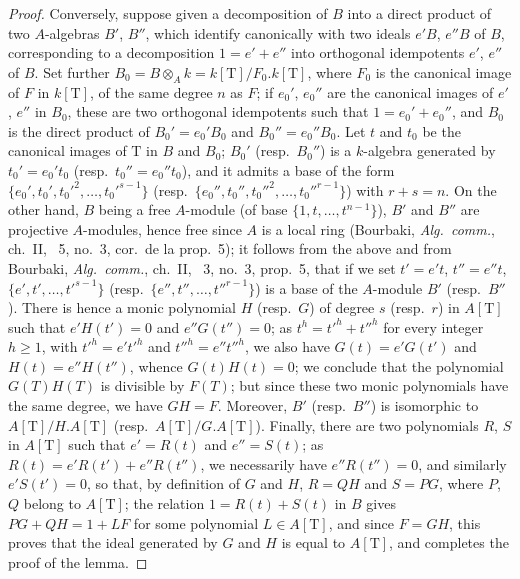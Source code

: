 \begin{proof}
Conversely, suppose given a decomposition of $B$ into a direct product of two $A$-algebras $B'$, $B''$, which identify canonically with two ideals $e'B$, $e''B$ of $B$, corresponding to a decomposition $1=e'+e''$ into orthogonal idempotents $e'$, $e''$ of $B$.
Set further $B_0=B\otimes_A k=k[\mathrm{T}]/F_0.k[\mathrm{T}]$, where $F_0$ is the canonical image of $F$ in $k[\mathrm{T}]$, of the same degree $n$ as $F$;
if $e_0'$, $e_0''$ are the canonical images of $e'$, $e''$ in $B_0$, these are two orthogonal idempotents such that $1=e_0'+e_0''$, and $B_0$ is the direct product of $B_0'=e_0'B_0$ and $B_0''=e_0''B_0$.
Let $t$ and $t_0$ be the canonical images of $\mathrm{T}$ in $B$ and $B_0$;
$B_0'$ (resp.\ $B_0''$) is a $k$-algebra generated by $t_0'=e_0't_0$ (resp.\ $t_0''=e_0''t_0$), and it admits a base of the form $\{e_0',t_0',t_0'^2,\ldots,t_0'^{s-1}\}$ (resp.\ $\{e_0'',t_0'',t_0''^2,\ldots,t_0''^{r-1}\}$) with $r+s=n$.
On the other hand, $B$ being a free $A$-module (of base $\{1,t,\ldots,t^{n-1}\}$), $B'$ and $B''$ are projective $A$-modules, hence free since $A$ is a local ring (Bourbaki, \emph{Alg.\ comm.}, ch.~II, \textsection~5, no.~3, cor.\ de la prop.~5);
it follows from the above and from Bourbaki, \emph{Alg.\ comm.}, ch.~II, \textsection~3, no.~3, prop.~5, that if we set $t'=e't$, $t''=e''t$, $\{e',t',\ldots,t'^{s-1}\}$ (resp.\ $\{e'',t'',\ldots,t''^{r-1}\}$) is a base of the $A$-module $B'$ (resp.\ $B''$).
There is hence a monic polynomial $H$ (resp.\ $G$) of degree $s$ (resp.\ $r$) in $A[\mathrm{T}]$ such that $e'H(t')=0$ and $e''G(t'')=0$;
as $t^h=t'^h+t''^h$ for every integer $h\geq 1$, with $t'^h=e't'^h$ and $t''^h=e''t''^h$, we also have $G(t)=e'G(t')$ and $H(t)=e''H(t'')$, whence $G(t)H(t)=0$;
we conclude that the polynomial $G(T)H(T)$ is divisible by $F(T)$;
but since these two monic polynomials have the same degree, we have $GH=F$.
Moreover, $B'$ (resp.\ $B''$) is isomorphic to $A[\mathrm{T}]/H.A[\mathrm{T}]$ (resp.\ $A[\mathrm{T}]/G.A[\mathrm{T}]$).
Finally, there are two polynomials $R$, $S$ in $A[\mathrm{T}]$ such that $e'=R(t)$ and $e''=S(t)$;
as $R(t)=e'R(t')+e''R(t'')$, we necessarily have $e''R(t'')=0$, and similarly $e'S(t')=0$, so that, by definition of $G$ and $H$, $R=QH$ and $S=PG$, where $P$, $Q$ belong to $A[\mathrm{T}]$;
the relation $1=R(t)+S(t)$ in $B$ gives $PG+QH=1+LF$ for some polynomial $L\in A[\mathrm{T}]$, and since $F=GH$, this proves that the ideal generated by $G$ and $H$ is equal to $A[\mathrm{T}]$, and completes the proof of the lemma.
\end{proof}

